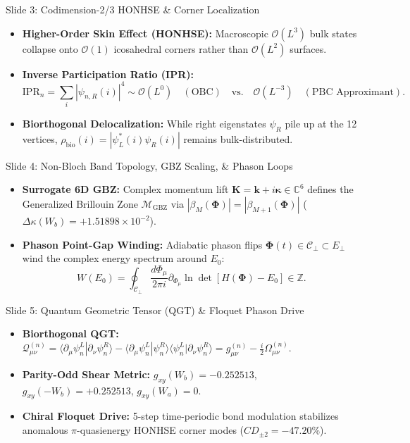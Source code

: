 \documentclass[aspectratio=169,10pt]{beamer}
\begin{document}
\begin{frame}{Slide 3: Codimension-2/3 HONHSE \& Corner Localization}
\begin{itemize}
\item \textbf{Higher-Order Skin Effect (HONHSE):} Macroscopic $\mathcal{O}(L^3)$ bulk states collapse onto $\mathcal{O}(1)$ icosahedral corners rather than $\mathcal{O}(L^2)$ surfaces.
\item \textbf{Inverse Participation Ratio (IPR):}
\[
\mathrm{IPR}_n = \sum_i |\psi_{n,R}(i)|^4 \sim \mathcal{O}(L^0) \quad (\text{OBC}) \quad \text{vs.} \quad \mathcal{O}(L^{-3}) \quad (\text{PBC Approximant}).
\]
\item \textbf{Biorthogonal Delocalization:} While right eigenstates $\psi_R$ pile up at the 12 vertices, $\rho_{\mathrm{bio}}(i) = |\psi_L^*(i)\psi_R(i)|$ remains bulk-distributed.
\end{itemize}
\end{frame}

\begin{frame}{Slide 4: Non-Bloch Band Topology, GBZ Scaling, \& Phason Loops}
\begin{itemize}
\item \textbf{Surrogate 6D GBZ:} Complex momentum lift $\bm{K} = \bm{k} + i\bm{\kappa} \in \mathbb{C}^6$ defines the Generalized Brillouin Zone $\mathcal{M}_{\mathrm{GBZ}}$ via $|\beta_M(\bm{\Phi})| = |\beta_{M+1}(\bm{\Phi})|$ ($\Delta\kappa(W_b) = +1.51898\times 10^{-2}$).
\item \textbf{Phason Point-Gap Winding:} Adiabatic phason flips $\bm{\Phi}(t) \in \mathcal{C}_\perp \subset E_\perp$ wind the complex energy spectrum around $E_0$:
\[
W(E_0) = \oint_{\mathcal{C}_\perp} \frac{d\Phi_\mu}{2\pi i} \partial_{\Phi_\mu} \ln \det[H(\bm{\Phi}) - E_0] \in \mathbb{Z}.
\]
\end{itemize}
\end{frame}

\begin{frame}{Slide 5: Quantum Geometric Tensor (QGT) \& Floquet Phason Drive}
\begin{itemize}
\item \textbf{Biorthogonal QGT:} $\mathcal{Q}_{\mu\nu}^{(n)} = \langle\partial_\mu\psi_n^L|\partial_\nu\psi_n^R\rangle - \langle\partial_\mu\psi_n^L|\psi_n^R\rangle\langle\psi_n^L|\partial_\nu\psi_n^R\rangle = g_{\mu\nu}^{(n)} - \frac{i}{2}\Omega_{\mu\nu}^{(n)}$.
\item \textbf{Parity-Odd Shear Metric:} $g_{xy}(W_b) = -0.252513$, $g_{xy}(-W_b) = +0.252513$, $g_{xy}(W_a) = 0$.
\item \textbf{Chiral Floquet Drive:} 5-step time-periodic bond modulation stabilizes anomalous $\pi$-quasienergy HONHSE corner modes ($CD_{\pm 2} = -47.20\%$).
\end{itemize}
\end{frame}
\end{document}
